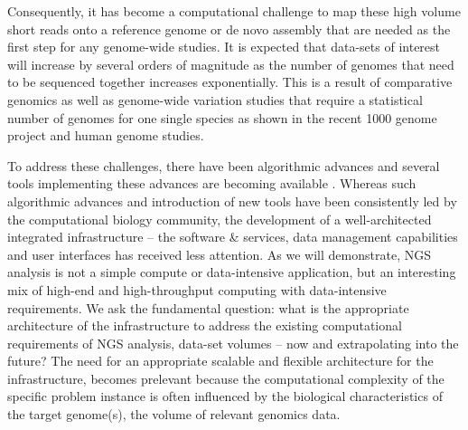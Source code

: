\documentclass{acm_proc_article-sp}
\begin{document}
Consequently, it has become a computational challenge to map these
high volume short reads onto a reference genome or de novo assembly
that are needed as the first step for any genome-wide
studies\cite{alex2009,trapnell2009,scheibye-alsing2009,pop2002,hernandez2008,farrer2008}.
It is expected that data-sets of interest will increase by several
orders of magnitude as the number of genomes that need to be sequenced
together increases exponentially.  This is a result of comparative
genomics as well as genome-wide variation studies that require a
statistical number of genomes for one single species as shown in the
recent 1000 genome project and human genome
studies\cite{1000genome,mardis2008-tig,gilad2009,alex2009,kim2011}.


To address these challenges, there have been algorithmic advances and
several tools implementing these advances are becoming available
\cite{trapnell2009,bfast2009,scheibye-alsing2009,pepke2009,samtools}.
Whereas such algorithmic advances and introduction of new tools have
been consistently led by the computational biology community, the
development of a well-architected integrated infrastructure -- the
software \& services, data management capabilities and user interfaces
has received less attention.  As we will demonstrate, NGS analysis is
not a simple compute or data-intensive application, but an interesting
mix of high-end and high-throughput computing with data-intensive
requirements.  We ask the fundamental question: what is the
appropriate architecture of the infrastructure to address the existing
computational requirements of NGS analysis, data-set volumes -- now
and extrapolating into the future?  The need for an appropriate
scalable and flexible architecture for the infrastructure, becomes
prelevant because the computational complexity of the specific problem
instance is often influenced by the biological characteristics of the
target genome(s), the volume of relevant genomics data.

\end{document}
